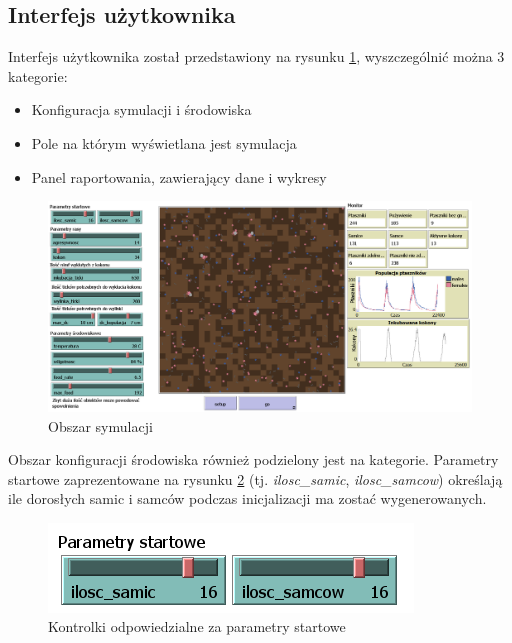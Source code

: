 \documentclass[a4paper,11pt,titlepage]{article}
\begin{document}
\subsection{Interfejs użytkownika}
Interfejs użytkownika został przedstawiony na rysunku \ref{fig:9}, wyszczególnić można 3 kategorie:
\begin{itemize}
	\item Konfiguracja symulacji i środowiska
	\item Pole na którym wyświetlana jest symulacja
	\item Panel raportowania, zawierający dane i wykresy
\end{itemize}

\begin{figure}[H]
\centering
\includegraphics[width=1\columnwidth]{img/symulacja.PNG}
\caption{Obszar symulacji}
\label{fig:9}
\end{figure}

Obszar konfiguracji środowiska również podzielony jest na kategorie. Parametry startowe zaprezentowane na rysunku \ref{fig:6} (tj. \textit{ilosc\_samic}, \textit{ilosc\_samcow}) określają ile dorosłych samic i samców podczas inicjalizacji ma zostać wygenerowanych.

\begin{figure}[H]
\centering
\includegraphics[width=.5\columnwidth]{img/parametry_startowe.PNG}
\caption{Kontrolki odpowiedzialne za parametry startowe}
\label{fig:6}
\end{figure}
\end{document}
